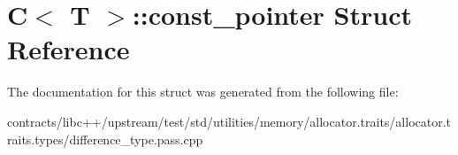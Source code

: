 \hypertarget{struct_c_1_1const__pointer}{}\section{C$<$ T $>$\+:\+:const\+\_\+pointer Struct Reference}
\label{struct_c_1_1const__pointer}


The documentation for this struct was generated from the following file\+:\begin{DoxyCompactItemize}
\item 
contracts/libc++/upstream/test/std/utilities/memory/allocator.\+traits/allocator.\+traits.\+types/difference\+\_\+type.\+pass.\+cpp\end{DoxyCompactItemize}
